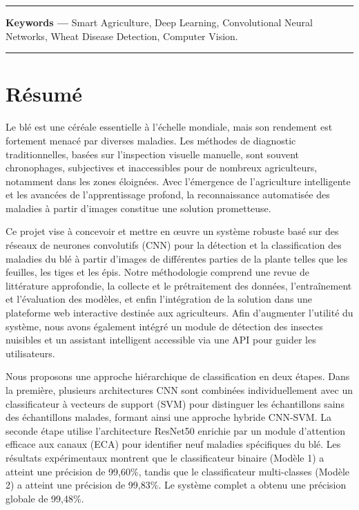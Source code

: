 \vspace{1cm}
    \noindent\rule{\linewidth}{1pt}
    \noindent
    \textbf{Keywords —} Smart Agriculture, Deep Learning, Convolutional Neural Networks, Wheat Disease Detection, Computer Vision.\\
    \noindent\rule{\linewidth}{1pt}






 

\cleardoublepage
{}
\setcounter{page}{2}
\chapter*{{\Huge\bfseries Résumé}}
\thispagestyle{noheader}

\vspace{0.5cm}

Le blé est une céréale essentielle à l’échelle mondiale, mais son rendement est fortement menacé par diverses maladies. Les méthodes de diagnostic traditionnelles, basées sur l’inspection visuelle manuelle, sont souvent chronophages, subjectives et inaccessibles pour de nombreux agriculteurs, notamment dans les zones éloignées. Avec l’émergence de l’agriculture intelligente et les avancées de l’apprentissage profond, la reconnaissance automatisée des maladies à partir d’images constitue une solution prometteuse.

Ce projet vise à concevoir et mettre en œuvre un système robuste basé sur des réseaux de neurones convolutifs (CNN) pour la détection et la classification des maladies du blé à partir d’images de différentes parties de la plante telles que les feuilles, les tiges et les épis. Notre méthodologie comprend une revue de littérature approfondie, la collecte et le prétraitement des données, l’entraînement et l’évaluation des modèles, et enfin l’intégration de la solution dans une plateforme web interactive destinée aux agriculteurs. Afin d’augmenter l’utilité du système, nous avons également intégré un module de détection des insectes nuisibles et un assistant intelligent accessible via une API pour guider les utilisateurs.

Nous proposons une approche hiérarchique de classification en deux étapes. Dans la première, plusieurs architectures CNN sont combinées individuellement avec un classificateur à vecteurs de support (SVM) pour distinguer les échantillons sains des échantillons malades, formant ainsi une approche hybride CNN-SVM. La seconde étape utilise l’architecture ResNet50 enrichie par un module d’attention efficace aux canaux (ECA) pour identifier neuf maladies spécifiques du blé. Les résultats expérimentaux montrent que le classificateur binaire (Modèle 1) a atteint une précision de 99{,}60\%, tandis que le classificateur multi-classes (Modèle 2) a atteint une précision de 99{,}83\%. Le système complet a obtenu une précision globale de 99{,}48\%.

